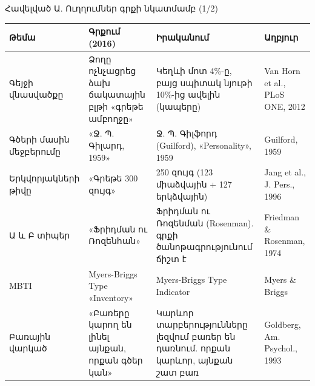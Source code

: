 \appendix
{}\gdef{}\gdef{}

\begin{frame}{Հավելված Ա. Ուղղումներ գրքի նկատմամբ (1/2)}
  \scriptsize
  \setlength{\tabcolsep}{4pt}
  \renewcommand{\arraystretch}{1.15}
  \begin{tabular}{@{}L{2.4cm}L{3.4cm}L{4.5cm}L{3.2cm}@{}}
    \toprule
    \textbf{Թեմա} & \textbf{Գրքում (2016)} & \textbf{Իրականում} & \textbf{Աղբյուր}\\
    \midrule
    Գեյջի վնասվածքը & Ձողը ոչնչացրեց ձախ ճակատային բլթի «գրեթե ամբողջը» & Կեղևի մոտ 4\%-ը, բայց սպիտակ նյութի 10\%-ից ավելին (կապերը) & Van Horn et al., PLoS ONE, 2012\\
    Գծերի մասին մեջբերումը & «Ջ. Պ. Գիլարդ, 1959» & Ջ. Պ. Գիլֆորդ (Guilford), «Personality», 1959 & Guilford, 1959\\
    Երկվորյակների թիվը & «Գրեթե 300 զույգ» & 250 զույգ (123 միաձվային + 127 երկձվային) & Jang et al., J. Pers., 1996\\
    Ա և Բ տիպեր & «Ֆրիդման ու Ռոզենհան» & Ֆրիդման ու Ռոզենման (Rosenman). գրքի ծանոթագրությունում ճիշտ է & Friedman \& Rosenman, 1974\\
    MBTI & Myers-Briggs Type «Inventory» & Myers-Briggs Type Indicator & Myers \& Briggs\\
    Բառային վարկած & «Բառերը կարող են լինել այնքան, որքան գծեր կան» & Կարևոր տարբերությունները լեզվում բառեր են դառնում. որքան կարևոր, այնքան շատ բառ & Goldberg, Am. Psychol., 1993\\
    \bottomrule
  \end{tabular}
\end{frame}

